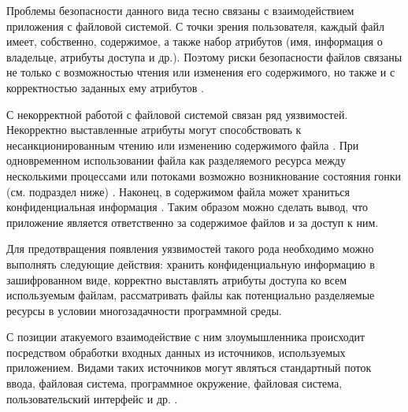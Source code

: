 

%
Проблемы безопасности данного вида тесно связаны с взаимодействием приложения с файловой системой. 
%
С точки зрения пользователя, каждый файл имеет, собственно, содержимое, а также набор атрибутов (имя, информация о владельце, атрибуты доступа и др.). 
%
Поэтому риски безопасности файлов связаны не только с возможностью чтения или изменения его содержимого, но также и с корректностью заданных ему атрибутов .

%
С некорректной работой с файловой системой связан ряд уязвимостей. 
%
Некорректно выставленные атрибуты могут способствовать к несанкционированным чтению или изменению содержимого файла . 
%
При одновременном использовании файла как разделяемого ресурса между несколькими процессами или потоками возможно возникнование состояния гонки (см. подраздел ниже)  . 
%
Наконец, в содержимом файла может храниться конфиденциальная информация . 
%
Таким образом можно сделать вывод, что приложение является ответственно за содержимое файлов и за доступ к ним.

%
Для предотвращения появления уязвимостей такого рода необходимо можно выполнять следующие действия: хранить конфиденциальную информацию в зашифрованном виде, корректно выставлять атрибуты доступа ко всем используемым файлам, рассматривать файлы как потенциально разделяемые ресурсы в условии многозадачности программной среды.



%
С позиции атакуемого  взаимодействие с ним злоумышленника происходит посредством обработки входных данных из источников, используемых приложением. 
%
Видами таких источников могут являться стандартный поток ввода, файловая система, программное окружение, файловая система, пользовательский интерфейс и др.  . 

